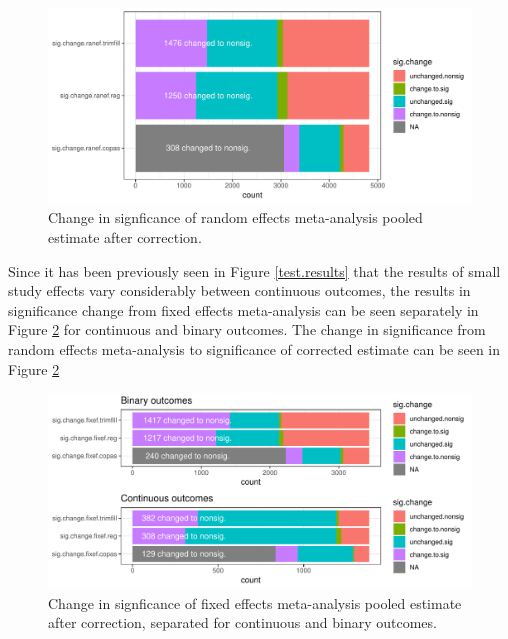 \documentclass[11pt,a4paper,twoside]{book}\usepackage[]{graphicx}\usepackage[]{color}
\newenvironment{knitrout}{}{} %
\begin{document}
\begin{figure}
\begin{knitrout}
\color{fgcolor}

{\centering \includegraphics[width=\textwidth-3cm]{figure/ch02_figunnamed-chunk-37-1} 

}



\end{knitrout}
\caption{Change in signficance of random effects meta-analysis pooled estimate after correction.}
\label{significance.change.random}
\end{figure}

Since it has been previously seen in Figure \ref{test.results} that the results of small study effects vary considerably between continuous outcomes, the results in significance change from fixed effects meta-analysis can be seen separately in Figure \ref{significance.change.fixed.sep} for continuous and binary outcomes. The change in significance from random effects meta-analysis to significance of corrected estimate can be seen in Figure \ref{significance.change.fixed.sep}

\begin{figure}
\begin{knitrout}
\color{fgcolor}

{\centering \includegraphics[width=\textwidth-3cm]{figure/ch02_figunnamed-chunk-38-1} 

}



\end{knitrout}
\caption{Change in signficance of fixed effects meta-analysis pooled estimate after correction, separated for continuous and binary outcomes.}
\label{significance.change.fixed.sep}
\end{figure}
\end{document}
